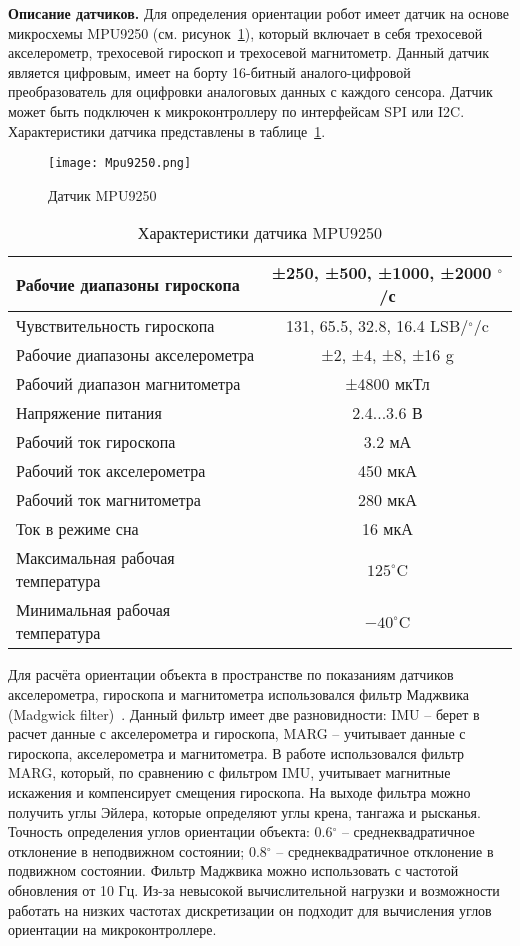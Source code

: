 \textbf{Описание датчиков.} Для определения ориентации робот имеет датчик на основе микросхемы MPU9250 (см. рисунок~\ref{Mpu9250}), который включает в себя трехосевой акселерометр, трехосевой гироскоп и трехосевой магнитометр. Данный датчик является цифровым, имеет на борту 16-битный аналого-цифровой преобразователь для оцифровки аналоговых данных с каждого сенсора. Датчик может быть подключен к микроконтроллеру по интерфейсам SPI или I2C. Характеристики датчика представлены в таблице~\ref{tabMpu}.

\begin{figure}[h]
	\centering
	\texttt{[image: Mpu9250.png]}%
	\caption{Датчик MPU9250}
	\label{Mpu9250}
\end{figure}

\begin{table}[h]
	\centering
	\caption{Характеристики датчика MPU9250}\label{tabMpu}
	\begin{tabular}{|l|c|}
		\hline
		Рабочие диапазоны гироскопа & ±250, ±500, ±1000, ±2000 $^\circ$/с \\ \hline
		Чувствительность гироскопа & 131, 65.5, 32.8, 16.4 LSB/$^\circ$/c \\ \hline
		Рабочие диапазоны акселерометра & ±2, ±4, ±8, ±16 g\\ \hline
		Рабочий диапазон магнитометра & ±4800 мкТл\\ \hline
		Напряжение питания & 2.4...3.6 В\\ \hline
		Рабочий ток гироскопа & 3.2 мА\\ \hline
		Рабочий ток акселерометра & 450 мкА\\ \hline
		Рабочий ток магнитометра & 280 мкА\\ \hline
		Ток в режиме сна & 16 мкА \\ \hline
		Максимальная рабочая температура	&	$125^\circ$C 	\\ \hline
		Минимальная рабочая температура 	&	$-40^\circ$C \\ \hline
	\end{tabular}
\end{table}

Для расчёта ориентации объекта в пространстве по показаниям датчиков акселерометра, гироскопа и магнитометра использовался фильтр Маджвика (Madgwick filter)~\cite{Madgwick}. Данный фильтр имеет две разновидности: IMU -- берет в  расчет данные с акселерометра и гироскопа, MARG -- учитывает данные с гироскопа, акселерометра и магнитометра. В работе использовался фильтр MARG, который, по сравнению с фильтром IMU, учитывает магнитные искажения и компенсирует смещения гироскопа. На выходе фильтра можно получить углы Эйлера, которые определяют углы крена, тангажа и рысканья. Точность определения углов ориентации объекта: 0.6$^\circ$ -- среднеквадратичное отклонение в неподвижном состоянии; 0.8$^\circ$ -- среднеквадратичное отклонение в подвижном состоянии.
Фильтр Маджвика можно использовать с частотой обновления от 10 Гц. Из-за невысокой вычислительной нагрузки и возможности работать на низких частотах дискретизации он подходит для вычисления углов ориентации на микроконтроллере. 

